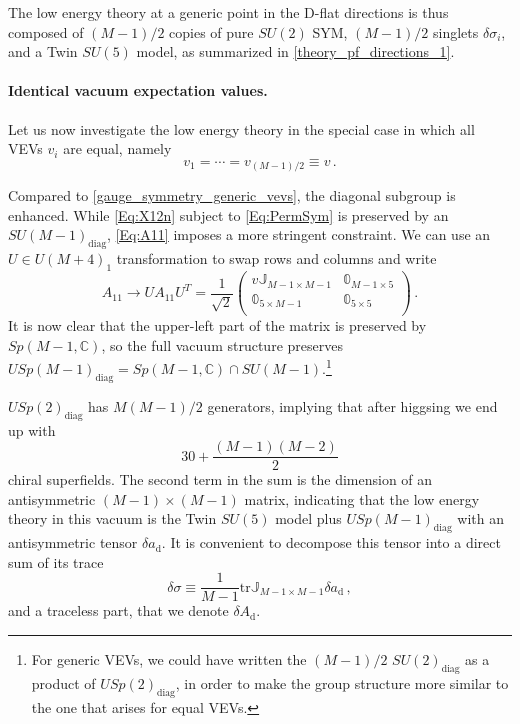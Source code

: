 \documentclass[a4paper,12pt]{article}
\begin{document}
{The low energy theory at a generic point in the D-flat directions is thus composed of $(M-1)/2$ copies of pure $SU(2)$ SYM, $(M-1)/2$ singlets $\delta \sigma_{i}$, and a Twin $SU(5)$ model, as summarized in \eqref{theory_pf_directions_1}.


\paragraph{Identical vacuum expectation values.} 

Let us now investigate the low energy theory in the special case in which all VEVs $v_i$ are equal, namely 
\begin{equation}
v_1 = \cdots = v_{(M-1)/2} \equiv v \, . \label{Eq:PermSym}
\end{equation}

Compared to \eqref{gauge_symmetry_generic_vevs}, the diagonal subgroup is enhanced. While \eqref{Eq:X12n} subject to \eqref{Eq:PermSym} is preserved by an $SU(M-1)_\text{diag}$, \eqref{Eq:A11} imposes a more stringent constraint. We can use an $U \in U(M+4)_1$ transformation to swap rows and columns and write
\begin{equation}
A_{11} \rightarrow U A_{11} U^T = \frac{1}{\sqrt{2}} \left(\begin{array}{c|c}
	v \mathbb{J}_{M-1\times M-1} & \mathbb{0}_{M-1 \times5} \\ \hline
	\mathbb{0}_{5\times M-1} & \mathbb{0}_{5\times5} \\
\end{array} \right)\, .
\end{equation}
It is now clear that the upper-left part of the matrix is preserved by $Sp(M-1,\mathbb{C})$, so the full vacuum structure preserves $USp(M-1)_\text{diag} = Sp(M-1,\mathbb{C}) \cap SU(M-1)$.\footnote{For generic VEVs, we could have written the $(M-1)/2$ $SU(2)_\text{diag}$ as a product of $USp(2)_\text{diag}$, in order to make the group structure more similar to the one that arises for equal VEVs.}

$USp(2)_\text{diag}$ has $M(M-1)/2$ generators, implying that after higgsing we end up with
\begin{equation}
30 + \frac{(M-1)(M-2)}{2}  \label{Eq:CountingSym}
\end{equation}
chiral superfields. The second term in the sum is the dimension of an antisymmetric $(M-1) \times (M-1)$ matrix, indicating that the low energy theory in this vacuum is the Twin $SU(5)$ model plus $USp(M-1)_\text{diag}$ with an antisymmetric tensor $\delta a_\text{d}$. It is convenient to decompose this tensor into a direct sum of its trace
\begin{equation}
	\delta \sigma \equiv \frac{1}{M-1}\mathrm{tr} \mathbb{J}_{M-1 \times M-1} \delta a_\text{d} \, ,
\end{equation}
and a traceless part, that we denote $\delta A_\text{d}$.

}
\end{document}

